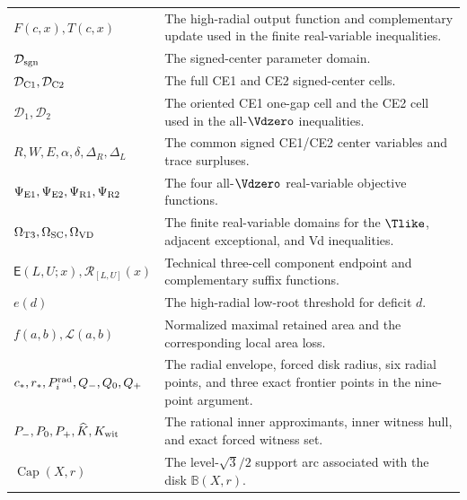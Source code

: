 \begin{longtable}{@{}p{}p{}@{}}
$F(c,x),T(c,x)$&
The high-radial output function and complementary update used in the finite
real-variable inequalities.\\
$\mathcal D_{\rm sgn}$&
The signed-center parameter domain.\\
$\mathcal D_{\rm C1},\mathcal D_{\rm C2}$&
The full CE1 and CE2 signed-center cells.\\
$\mathcal D_1,\mathcal D_2$&
The oriented CE1 one-gap cell and the CE2 cell used in the all-$\Vdzero$
inequalities.\\
$R,W,E,\alpha,\delta,\Delta_R,\Delta_L$&
The common signed CE1/CE2 center variables and trace surpluses.\\
$\Psi_{\rm E1},\Psi_{\rm E2},\Psi_{\rm R1},\Psi_{\rm R2}$&
The four all-$\Vdzero$ real-variable objective functions.\\
$\Omega_{\rm T3},\Omega_{\rm SC},\Omega_{\rm VD}$&
The finite real-variable domains for the $\Tlike$, adjacent exceptional, and
Vd inequalities.\\
$\mathsf E(L,U;x),\mathcal R_{[L,U]}(x)$&
Technical three-cell component endpoint and complementary suffix functions.\\
$e(d)$&
The high-radial low-root threshold for deficit $d$.\\
$f(a,b),\mathcal L(a,b)$&
Normalized maximal retained area and the corresponding local area loss.\\
$c_\ast,r_\ast,P_i^{\rm rad},Q_-,Q_0,Q_+$&
The radial envelope, forced disk radius, six radial points, and three exact
frontier points in the nine-point argument.\\
$P_-,P_0,P_+,\widehat K,K_{\rm wit}$&
The rational inner approximants, inner witness hull, and exact forced witness
set.\\
$\operatorname{Cap}(X,r)$&
The level-$\sqrt3/2$ support arc associated with the disk
$\mathbb B(X,r)$.\\
\end{longtable}
\normalsize
